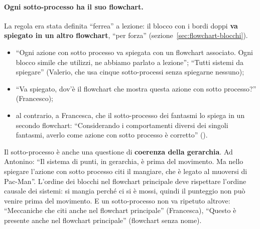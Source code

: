 \paragraph{Ogni sotto-processo ha il suo flowchart.} La regola era stata
definita ``ferrea'' a lezione: il blocco con i bordi doppi \textbf{va spiegato
in un altro flowchart}, ``per forza'' (sezione~\ref{sec:flowchart-blocchi}).
\begin{itemize}
  \item ``Ogni azione con sotto processo va spiegata con un flowchart
        associato. Ogni blocco simile che utilizzi, ne abbiamo parlato a
        lezione''; ``Tutti sistemi da spiegare'' (Valerio, che usa cinque
        sotto-processi senza spiegarne nessuno);
  \item ``Va spiegato, dov'è il flowchart che mostra questa azione con sotto
        processo?'' (Francesco);
  \item al contrario, a Francesca, che il sotto-processo dei fantasmi lo
        spiega in un secondo flowchart: ``Considerando i comportamenti diversi
        dei singoli fantasmi, averlo come azione con sotto processo è
        corretto'' (\rvBene).
\end{itemize}
Il sotto-processo è anche una questione di \textbf{coerenza della
gerarchia}. Ad Antonino: ``Il sistema di punti, in gerarchia, è prima del
movimento. Ma nello spiegare l'azione con sotto processo citi il mangiare, che
è legato al muoversi di Pac-Man''. L'ordine dei blocchi nel flowchart
principale deve rispettare l'ordine causale dei sistemi: si mangia perché ci
si è mossi, quindi il punteggio non può venire prima del movimento. E un
sotto-processo non va ripetuto altrove: ``Meccaniche che citi anche nel
flowchart principale'' (Francesca), ``Questo è presente anche nel flowchart
principale'' (flowchart senza nome).

